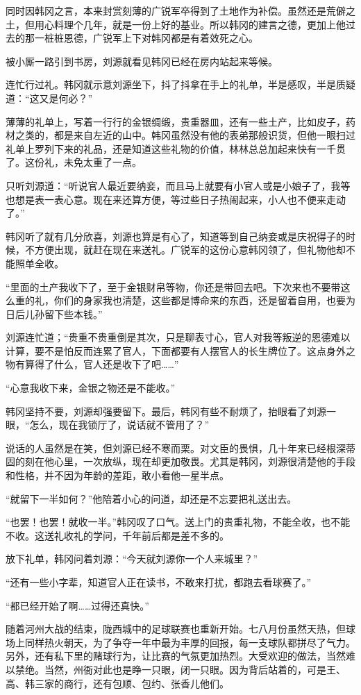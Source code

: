 同时因韩冈之言，本来封赏刻薄的广锐军卒得到了土地作为补偿。虽然还是荒僻之土，但用心料理个几年，就是一份上好的基业。所以韩冈的建言之德，更加上他过去的那一桩桩恩德，广锐军上下对韩冈都是有着效死之心。

被小厮一路引到书房，刘源就看见韩冈已经在房内站起来等候。

连忙行过礼。韩冈就示意刘源坐下，抖了抖拿在手上的礼单，半是感叹，半是质疑道：“这又是何必？”

薄薄的礼单上，写着一行行的金银绸缎，贵重器皿，还有一些土产，比如皮子，药材之类的，都是来自左近的山中。韩冈虽然没有他的表弟那般识货，但他一眼扫过礼单上罗列下来的礼品，还是知道这些礼物的价值，林林总总加起来快有一千贯了。这份礼，未免太重了一点。

只听刘源道：“听说官人最近要纳妾，而且马上就要有小官人或是小娘子了，我等也想是表一表心意。现在来还算方便，等过些日子热闹起来，小人也不便来走动了。”

韩冈听了就有几分欣喜，刘源也算是有心了，知道等到自己纳妾或是庆祝得子的时候，不方便出现，就赶在现在来送礼。广锐军的这份心意韩冈领了，但礼物他却不能照单全收。

“里面的土产我收下了，至于金银财帛等物，你还是带回去吧。下次来也不要带这么重的礼，你们的身家我也清楚，这些都是博命来的东西，还是留着自用，也要为日后儿孙留下些本钱。”

刘源连忙道；“贵重不贵重倒是其次，只是聊表寸心，官人对我等叛逆的恩德难以计算，要不是怕反而连累了官人，下面都要有人摆官人的长生牌位了。这点身外之物有算得了什么，官人还是收下了吧……”

“心意我收下来，金银之物还是不能收。”

韩冈坚持不要，刘源却强要留下。最后，韩冈有些不耐烦了，抬眼看了刘源一眼，“怎么，现在我锁厅了，说话就不管用了？”

说话的人虽然是在笑，但刘源已经不寒而栗。对文臣的畏惧，几十年来已经根深蒂固的刻在他心里，一次放纵，现在却更加敬畏。尤其是韩冈，刘源很清楚他的手段和性格，并不因为年龄的差距，敢小看他一星半点。

“就留下一半如何？”他陪着小心的问道，却还是不忘要把礼送出去。

“也罢！也罢！就收一半。”韩冈叹了口气。送上门的贵重礼物，不能全收，也不能不收。这送礼收礼的学问，千年前后都是差不多的。

放下礼单，韩冈问着刘源：“今天就刘源你一个人来城里？”

“还有一些小字辈，知道官人正在读书，不敢来打扰，都跑去看球赛了。”

“都已经开始了啊……过得还真快。”

随着河州大战的结束，陇西城中的足球联赛也重新开始。七八月份虽然天热，但球场上同样热火朝天，为了争夺一年中最为丰厚的回报，每一支球队都拼尽了气力。另外，还有私下里的赌球行为，让比赛的气氛更加热烈。大受欢迎的做法，当然难以禁绝。当然，州衙对此也是睁一只眼，闭一只眼。因为背后站着的，可是王、高、韩三家的商行，还有包顺、包约、张香儿他们。

